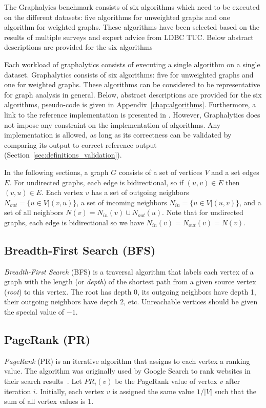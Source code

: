 The Graphalyics benchmark consists of six algorithms which need to be executed on the different datasets: five algorithms for unweighted graphs and one algorithm for weighted graphs. These algorithms have been selected based on the results of multiple surveys and expert advice from LDBC TUC. Below abstract descriptions are provided for the six algorithms 


Each workload of graphalytics consists of executing a single algorithm on a single dataset. Graphalytics consists of six algorithms: five for unweighted graphs and one for weighted graphs.  These algorithms can be considered to be representative for graph analysis in general. Below, abstract descriptions are provided for the six algorithms, pseudo-code is given in Appendix~\ref{chap:algorithms}. Furthermore, a link to the reference implementation is presented in . However, Graphalytics does not impose any constraint on the implementation of algorithms. Any implementation is allowed, as long as its correctness can be validated by comparing its output to correct reference output (Section~\ref{sec:definitions_validation}). 

In the following sections, a graph $G$ consists of a set of vertices $V$ and a set edges $E$. For undirected graphs, each edge is bidirectional, so if $(u,v)\in E$ then $(v,u)\in E$. Each vertex $v$ has a set of outgoing neighbors $N_{out} = \{u \in V | (v, u) \}$, a set of incoming neighbors $N_{in} = \{u \in V | (u, v) \}$, and a set of all neighbors $N(v)=N_{in}(v)  \cup  N_{out}(u)$. Note that for undirected graphs, each edge is bidirectional so we have $N_{in}(v) = N_{out}(v) = N(v)$.

\subsection{Breadth-First Search (BFS)}
\emph{Breadth-First Search} (BFS) is a traversal algorithm that labels each vertex of a graph with the length (or \emph{depth}) of the shortest path from a given source vertex (\emph{root}) to this vertex. The root has depth 0, its outgoing neighbors have depth 1, their outgoing neighbors have depth 2, etc. Unreachable vertices should be given the special value of $-1$.



\subsection{PageRank (PR)}
\emph{PageRank} (PR) is an iterative algorithm that assigns to each vertex a ranking value. The algorithm was originally used by Google Search to rank websites in their search results~\cite{page1999pagerank}. Let $PR_i(v)$ be the PageRank value of vertex $v$ after iteration $i$. Initially, each vertex $v$ is assigned the same value $1/|V|$ such that the sum of all vertex values is $1$.

